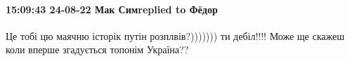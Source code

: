  
 
 
 
 

\paragraph{15:09:43 24-08-22 Мак Симreplied to Фёдор}

Це тобі цю маячню історік путін розплвів?))))))) ти дебіл!!!! Може ще скажеш
коли вперше згадується топонім Україна??
